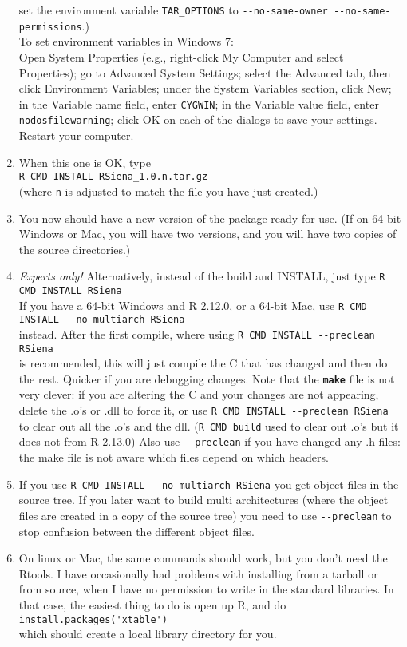 \documentclass[12pt, a4paper]{article}
\renewcommand{\=}{\,=\,}
\newcommand{\+}{\,+\,}
\newcommand{\sfn}[1]{\textbf{\texttt{#1}}}
\begin{document}
\begin{enumerate}
  set the environment variable \verb|TAR_OPTIONS| to
\verb|--no-same-owner --no-same-permissions|.)\\
  To set environment variables in Windows 7:\\
  Open System Properties (e.g., right-click My Computer and select Properties);
   go to Advanced System Settings;
    select the Advanced tab, then click Environment Variables;
    under the System Variables section, click New;
    in the Variable name field, enter \verb|CYGWIN|;
    in the Variable value field, enter \verb|nodosfilewarning|;
    click OK on each of the dialogs to save your settings.
    Restart your computer.
\item When this one is OK, type\\
\verb|R CMD INSTALL RSiena_1.0.n.tar.gz|\\
(where \verb|n| is adjusted to match the file you have just created.)
\item You now should have a new version of the package ready for use. (If on 64
  bit Windows or Mac, you will have two versions, and you will have two copies
  of the source directories.)
\item \emph{Experts only!} Alternatively, instead of the build and INSTALL, just
  type
  \verb|R CMD INSTALL RSiena|\\
  If you have a 64-bit Windows and R 2.12.0, or a 64-bit Mac, use
  \verb|R CMD INSTALL --no-multiarch RSiena|\\
  instead. After the first compile, where using
  \verb|R CMD INSTALL --preclean RSiena| \\is recommended, this will just
  compile the C that has changed and then do the rest.  Quicker if you are
  debugging changes. Note that the \sfn{make} file is not very clever: if you
  are altering the C and your changes are not appearing, delete the .o's or .dll
  to force it, or use
  \verb|R CMD INSTALL --preclean RSiena|\\
  to clear out all the .o's and the dll. (\verb|R CMD build| used to clear out
  .o's but it does not from R 2.13.0) Also use \verb|--preclean| if you have
  changed any .h files: the make file is not aware which files depend on which
  headers.
\item If you use \verb|R CMD INSTALL --no-multiarch RSiena|
you get object files in the source tree. If you later want to build multi
architectures (where the object files are created in a copy of the source tree)
you need to use \verb|--preclean| to stop confusion between the different object
files.
\item On linux or Mac, the same commands should work, but you don't need the
  Rtools. I have occasionally had problems with installing from a tarball or
  from source, when I have no permission to write in the standard libraries. In
  that case, the easiest thing to do is
  open up R, and do \\
\verb|install.packages('xtable')| \\which should create a
  local library directory for you.
\end{enumerate}
\end{document}
